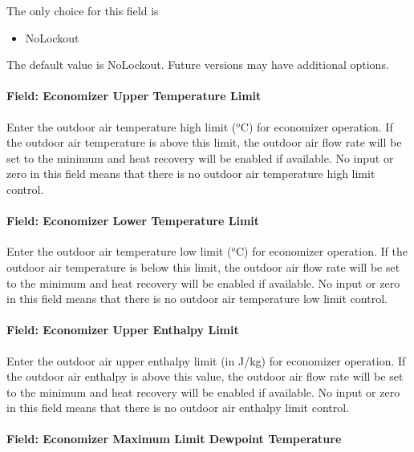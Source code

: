 The only choice for this field is

\begin{itemize}
\tightlist
\item
  NoLockout
\end{itemize}

The default value is NoLockout. Future versions may have additional options.

\paragraph{Field: Economizer Upper Temperature Limit}\label{field-economizer-upper-temperature-limit-3}

Enter the outdoor air temperature high limit (\(^{o}\)C) for economizer operation. If the outdoor air temperature is above this limit, the outdoor air flow rate will be set to the minimum and heat recovery will be enabled if available. No input or zero in this field means that there is no outdoor air temperature high limit control.

\paragraph{Field: Economizer Lower Temperature Limit}\label{field-economizer-lower-temperature-limit-3}

Enter the outdoor air temperature low limit (\(^{o}\)C) for economizer operation. If the outdoor air temperature is below this limit, the outdoor air flow rate will be set to the minimum and heat recovery will be enabled if available. No input or zero in this field means that there is no outdoor air temperature low limit control.

\paragraph{Field: Economizer Upper Enthalpy Limit}\label{field-economizer-upper-enthalpy-limit-3}

Enter the outdoor air upper enthalpy limit (in J/kg) for economizer operation. If the outdoor air enthalpy is above this value, the outdoor air flow rate will be set to the minimum and heat recovery will be enabled if available. No input or zero in this field means that there is no outdoor air enthalpy limit control.

\paragraph{Field: Economizer Maximum Limit Dewpoint Temperature}\label{field-economizer-maximum-limit-dewpoint-temperature-6}

